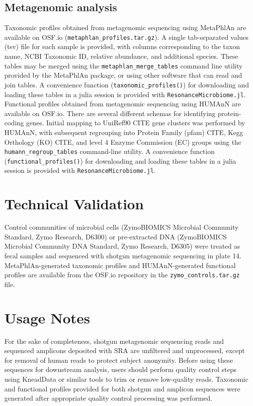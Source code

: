 \documentclass[fleqn,10pt]{wlscirep}
\begin{document}
\subsection*{Metagenomic analysis}

Taxonomic profiles obtained from metagenomic sequencing using MetaPhlAn are available on OSF.io (\verb|metaphlan_profiles.tar.gz|).
A single tab-separated values (tsv) file for each sample is provided,
with columns corresponding to the taxon name, NCBI Taxonomic ID, relative abundance, and additional species.
These tables may be merged using the \verb|metaphlan_merge_tables| command line utility provided by the MetaPhlAn package,
or using other software that can read and join tables.
A convenience function (\verb|taxonomic_profiles()|) for downloading and loading these tables in a julia session
is provided with \verb|ResonanceMicrobiome.jl|.
Functional profiles obtained from metagenomic sequencing using HUMAnN are available on OSF.io.
There are several different schemas for identifying protein-coding genes.
Initial mapping to UniRef90 {{CITE}} gene clusters was performed by HUMAnN,
with subsequent regrouping into Protein Family (pfam) {{CITE}}, Kegg Orthology (KO) {{CITE}},
and level 4 Enzyme Commission (EC) groups using the \verb|humann_regroup_tables| command-line utility.
A convenience function (\verb|functional_profiles()|) for downloading and loading these tables in a julia session
is provided with \verb|ResonanceMicrobiome.jl|.

\section*{Technical Validation}

Control communities of microbial cells (ZymoBIOMICS Microbial Community Standard, Zymo Research, D6300)
or pre-extracted DNA (ZymoBIOMICS Microbial Community DNA Standard, Zymo Research, D6305)
were treated as fecal samples and sequenced with shotgun metagenomic sequencing in plate 14.
MetaPhlAn-generated taxonomic profiles and HUMAnN-generated functional profiles
are available from the OSF.io repository in the \verb|zymo_controls.tar.gz| file.

\section*{Usage Notes}

For the sake of completeness, shotgun metagenomic sequencing reads and sequenced amplicons deposited with SRA
are unfiltered and unprocessed, except for removal of human reads to protect subject anonymity.
Before using these sequences for downstream analysis, users should perform quality control steps
using KneadData or similar tools to trim or remove low-quality reads.
Taxonomic and functional profiles provided for both shotgun and amplicon sequences
were generated after appropriate quality control processing was performed. 
\end{document}
